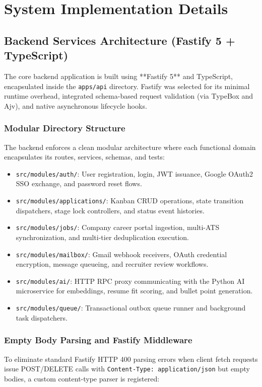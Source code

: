 \chapter{System Implementation Details}
\label{ch:implementation}

\section{Backend Services Architecture (Fastify 5 + TypeScript)}
The core backend application is built using **Fastify 5** and TypeScript, encapsulated inside the \texttt{apps/api} directory. Fastify was selected for its minimal runtime overhead, integrated schema-based request validation (via TypeBox and Ajv), and native asynchronous lifecycle hooks.

\subsection{Modular Directory Structure}
The backend enforces a clean modular architecture where each functional domain encapsulates its routes, services, schemas, and tests:
\begin{itemize}
    \item \texttt{src/modules/auth/}: User registration, login, JWT issuance, Google OAuth2 SSO exchange, and password reset flows.
    \item \texttt{src/modules/applications/}: Kanban CRUD operations, state transition dispatchers, stage lock controllers, and status event histories.
    \item \texttt{src/modules/jobs/}: Company career portal ingestion, multi-ATS synchronization, and multi-tier deduplication execution.
    \item \texttt{src/modules/mailbox/}: Gmail webhook receivers, OAuth credential encryption, message queueing, and recruiter review workflows.
    \item \texttt{src/modules/ai/}: HTTP RPC proxy communicating with the Python AI microservice for embeddings, resume fit scoring, and bullet point generation.
    \item \texttt{src/modules/queue/}: Transactional outbox queue runner and background task dispatchers.
\end{itemize}

\subsection{Empty Body Parsing and Fastify Middleware}
To eliminate standard Fastify HTTP 400 parsing errors when client fetch requests issue POST/DELETE calls with \texttt{Content-Type: application/json} but empty bodies, a custom content-type parser is registered:

